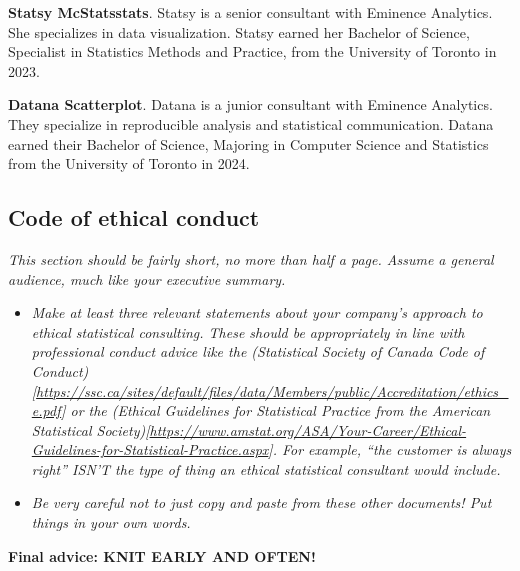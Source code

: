 \documentclass[
          english,
          paper=a4,
              ,captions=tableheading
  ]{scrartcl}
\providecommand{\tightlist}{%
        \setlength{\itemsep}{0pt}\setlength{\parskip}{0pt}}
\begin{document}
\textbf{Statsy McStatsstats}. Statsy is a senior consultant with
Eminence Analytics. She specializes in data visualization. Statsy earned
her Bachelor of Science, Specialist in Statistics Methods and Practice,
from the University of Toronto in 2023.

\textbf{Datana Scatterplot}. Datana is a junior consultant with Eminence
Analytics. They specialize in reproducible analysis and statistical
communication. Datana earned their Bachelor of Science, Majoring in
Computer Science and Statistics from the University of Toronto in 2024.

\hypertarget{code-of-ethical-conduct}{%
\subsection{Code of ethical conduct}\label{code-of-ethical-conduct}}

\emph{This section should be fairly short, no more than half a page.
Assume a general audience, much like your executive summary.}

\begin{itemize}
\tightlist
\item
  \emph{Make at least three relevant statements about your company's
  approach to ethical statistical consulting. These should be
  appropriately in line with professional conduct advice like the
  (Statistical Society of Canada Code of
  Conduct){[}\url{https://ssc.ca/sites/default/files/data/Members/public/Accreditation/ethics_e.pdf}{]}
  or the (Ethical Guidelines for Statistical Practice from the American
  Statistical
  Society){[}\url{https://www.amstat.org/ASA/Your-Career/Ethical-Guidelines-for-Statistical-Practice.aspx}{]}.
  For example, ``the customer is always right'' ISN'T the type of thing
  an ethical statistical consultant would include.}
\item
  \emph{Be very careful not to just copy and paste from these other
  documents! Put things in your own words.}
\end{itemize}

\textbf{Final advice: KNIT EARLY AND OFTEN!}
\end{document}

